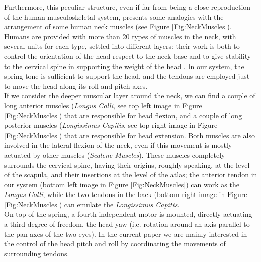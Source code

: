 \documentclass[conference]{IEEEtran}
\numberwithin{equation}{section}
\begin{document}
Furthermore, this peculiar structure, even if far from being a close reproduction of the human musculoskeletal system, presents some analogies with the arrangement of some human neck muscles (see Figure \ref{Fig:NeckMuscles}). Humans are provided with more than 20 types of muscles in the neck, with several units for each type, settled into different layers: their work is both to control the orientation of the head respect to the neck base and to give stability to the cervical spine in supporting the weight of the head \cite{Kendall05muscles}. In our system, the spring tone is sufficient to support the head, and the tendons are employed just to move the head along its roll and pitch axes.\\If we consider the deeper muscular layer around the neck, we can find a couple of long anterior muscles (\emph{Longus Colli}, see top left image in Figure \ref{Fig:NeckMuscles}) that are responsible for head flexion, and a couple of long posterior muscles (\emph{Longissimus Capitis}, see top right image in Figure \ref{Fig:NeckMuscles}) that are responsible for head extension. Both muscles are also involved in the lateral flexion of the neck, even if this movement is mostly actuated by other muscles (\emph{Scalene Muscles}). These muscles completely surrounds the cervical spine, having their origins, roughly speaking, at the level of the scapula, and their insertions at the level of the atlas; the anterior tendon in our system (bottom left image in Figure \ref{Fig:NeckMuscles}) can work as the \emph{Longus Colli}, while the two tendons in the back (bottom right image in Figure \ref{Fig:NeckMuscles}) can emulate the \emph{Longissimus Capitis}.\\On top of the spring, a fourth independent motor is mounted, directly actuating a third degree of freedom, the head yaw (i.e. rotation around an axis parallel to the pan axes of the two eyes). In the current paper we are mainly interested in the control of the head pitch and roll by coordinating the movements of surrounding tendons.
\end{document}
